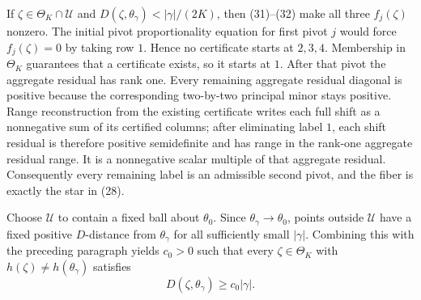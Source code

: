 If \(\zeta\in\Theta_K\cap\mathcal U\) and
\(D(\zeta,\theta_\gamma)<|\gamma|/(2K)\), then (31)--(32) make all three \(f_j(\zeta)\) nonzero.  The initial pivot proportionality equation for first pivot \(j\) would force \(f_j(\zeta)=0\) by taking row \(1\).  Hence no certificate starts at \(2,3,4\).  Membership in \(\Theta_K\) guarantees that a certificate exists, so it starts at \(1\).  After that pivot the aggregate residual has rank one.  Every remaining aggregate residual diagonal is positive because the corresponding two-by-two principal minor stays positive.  Range reconstruction from the existing certificate writes each full shift as a nonnegative sum of its certified columns; after eliminating label \(1\), each shift residual is therefore positive semidefinite and has range in the rank-one aggregate residual range.  It is a nonnegative scalar multiple of that aggregate residual.  Consequently every remaining label is an admissible second pivot, and the fiber is exactly the star in (28).

Choose \(\mathcal U\) to contain a fixed ball about \(\theta_0\).  Since \(\theta_\gamma\to\theta_0\), points outside \(\mathcal U\) have a fixed positive \(D\)-distance from \(\theta_\gamma\) for all sufficiently small \(|\gamma|\).  Combining this with the preceding paragraph yields \(c_0>0\) such that every \(\zeta\in\Theta_K\) with \(h(\zeta)\ne h(\theta_\gamma)\) satisfies
\[
 D(\zeta,\theta_\gamma)\ge c_0|\gamma|. \tag{33}
\]

